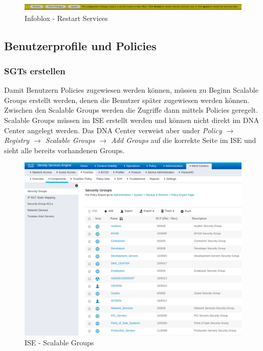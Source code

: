 \begin{figure}[H]
	\centering
	\includegraphics[height=0.4cm]{img/secondtry/infoblox-restart-services.png}
	\caption{Infoblox - Restart Services}
	\label{fig:infoblox-restart-services}
\end{figure}

\subsection{Benutzerprofile und Policies}

\subsubsection{SGTs erstellen}
\label{add-sgt}
Damit Benutzern Policies zugewiesen werden können, müssen zu Beginn Scalable Groups erstellt werden, denen die Benutzer später zugewiesen werden können. Zwischen den Scalable Groups werden die Zugriffe dann mittels Policies geregelt.
Scalable Groups müssen im ISE erstellt werden und können nicht direkt im DNA Center angelegt werden. Das DNA Center verweist aber under  \textit{Policy $\rightarrow$ Registry $\rightarrow$ Scalable Groups $\rightarrow$ Add Groups} auf die korrekte Seite im ISE und sieht alle bereits vorhandenen Groups. 

\begin{figure}[H]
	\centering
	\includegraphics[width=12cm]{img/secondtry/ise-scalable-groups.png}
	\caption{ISE - Scalable Groups}
	\label{fig:ise-scalable-groups}
\end{figure}

